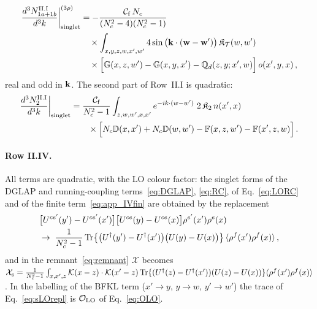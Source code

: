 \begin{align}\label{eq:oIII1sin}
\frac{d^3N^{\rm II.I}_{1a+1b}}{d^3k}\bigg|^{(3\rho)}_{\rm singlet}&=-\frac{\mathcal C_{\rm f}\,N_c}{(N_c^2-4)(N_c^2-1)}\notag\\
&\quad\times\int_{x,y,z,w,x',w'}4\sin\big(\mathbf{k}\cdot(\mathbf{w}-\mathbf{w}')\big)\,\mathfrak K_{\mathcal T}(w,w')\notag\\
&\quad\times\Big[\mathbb{G}(x,z,w')-\mathbb{G}(x,y,x')-\mathbb{Q}_d(z,y;x',w)\Big]\,o(x',y,x)\,,
\end{align}
real and odd in $\mathbf{k}$. The second part of Row~II.I is quadratic:
\begin{align}\label{eq:sIII2}
\frac{d^3N^{\rm II.I}_2}{d^3k}\bigg|_{\rm singlet}&=\frac{\mathcal C_{\rm f}}{N_c^2-1}\int_{z,w,w',x,x'}e^{-ik\cdot(w-w')}\;2\,\mathfrak K_2\,n(x',x)\notag\\&\qquad\times\Big[N_c\mathbb{D}(x,x')+N_c\mathbb{D}(w,w')-\mathbb{F}(x,z,w')-\mathbb{F}(x',z,w)\Big]\,.
\end{align}

\paragraph{Row II.IV.} All terms are quadratic, with the LO colour factor: the singlet forms of the DGLAP and running-coupling terms~\eqref{eq:DGLAP}, \eqref{eq:RC}, of Eq.~\eqref{eq:LORC} and of the finite term~\eqref{eq:app_IVfin} are obtained by the replacement
\begin{align}\label{eq:sLOrepl}
&\big[U^{ce'}(y')-U^{ce'}(x')\big]\big[U^{ce}(y)-U^{ce}(x)\big]\rho^{e'}(x')\rho^e(x)\notag\\&\to\;\frac{1}{N_c^2-1}\,{\rm Tr}\big\{\big(U^\dagger(y')-U^\dagger(x')\big)\big(U(y)-U(x)\big)\big\}\,\langle\rho^f(x')\rho^f(x)\rangle\,,
\end{align}
and in the remnant~\eqref{eq:remnant} $\mathcal X$ becomes $\mathcal X_{\rm s}=\frac{1}{N_c^2-1}\int_{x,x',z}\mathcal{K}(x-z)\cdot\mathcal{K}(x'-z)\,{\rm Tr}\{(U^\dagger(z)-U^\dagger(x'))(U(z)-U(x))\}\langle\rho^f(x')\rho^f(x)\rangle$. In the labelling of the BFKL term ($x'\to y$, $y\to w$, $y'\to w'$) the trace of Eq.~\eqref{eq:sLOrepl} is $\mathcal O_{\rm LO}$ of Eq.~\eqref{eq:OLO}.

